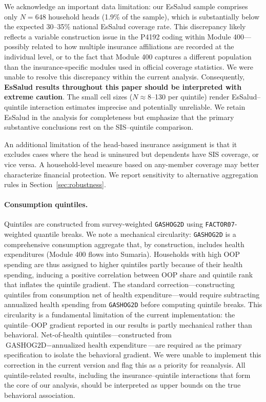 We acknowledge an important data limitation: our EsSalud sample comprises only $N = 648$ household heads (1.9\% of the sample), which is substantially below the expected 30--35\% national EsSalud coverage rate. This discrepancy likely reflects a variable construction issue in the P4192 coding within Module 400---possibly related to how multiple insurance affiliations are recorded at the individual level, or to the fact that Module 400 captures a different population than the insurance-specific modules used in official coverage statistics. We were unable to resolve this discrepancy within the current analysis. Consequently, \textbf{EsSalud results throughout this paper should be interpreted with extreme caution}. The small cell sizes ($N \approx 8$--130 per quintile) render EsSalud--quintile interaction estimates imprecise and potentially unreliable. We retain EsSalud in the analysis for completeness but emphasize that the primary substantive conclusions rest on the SIS--quintile comparison.

An additional limitation of the head-based insurance assignment is that it excludes cases where the head is uninsured but dependents have SIS coverage, or vice versa. A household-level measure based on any-member coverage may better characterize financial protection. We report sensitivity to alternative aggregation rules in Section~\ref{sec:robustness}.

\paragraph{Consumption quintiles.} Quintiles are constructed from survey-weighted \texttt{GASHOG2D} using \texttt{FACTOR07}-weighted quantile breaks. We note a mechanical circularity: \texttt{GASHOG2D} is a comprehensive consumption aggregate that, by construction, includes health expenditures (Module 400 flows into Sumaria). Households with high OOP spending are thus assigned to higher quintiles partly because of their health spending, inducing a positive correlation between OOP share and quintile rank that inflates the quintile gradient. The standard correction---constructing quintiles from consumption net of health expenditure---would require subtracting annualized health spending from \texttt{GASHOG2D} before computing quintile breaks. This circularity is a fundamental limitation of the current implementation: the quintile--OOP gradient reported in our results is partly mechanical rather than behavioral. Net-of-health quintiles---constructed from $\text{GASHOG2D} - \text{annualized health expenditure}$---are required as the primary specification to isolate the behavioral gradient. We were unable to implement this correction in the current version and flag this as a priority for reanalysis. All quintile-related results, including the insurance--quintile interactions that form the core of our analysis, should be interpreted as upper bounds on the true behavioral association.

